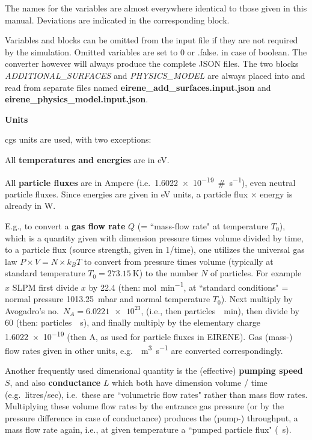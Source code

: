 The names for the variables are almost everywhere identical to those given in this manual. 
Deviations are indicated in the corresponding block.

Variables and blocks can be omitted from the input file if they are not required by the 
simulation. Omitted variables are set to 0 or .false. in case of boolean. The converter however
will always produce the complete JSON files. The two blocks \textsl{ADDITIONAL\_SURFACES} 
and \textsl{PHYSICS\_MODEL} are always placed into and read from separate files named 
\textbf{eirene\_add\_surfaces.input.json} and \textbf{eirene\_physics\_model.input.json}.


\medskip

\medskip

\textbf{Units} 

cgs units are used, with two exceptions:

\medskip

All \textbf{temperatures and energies} are in \si{\electronvolt}.

All \textbf{particle fluxes} are in Ampere (i.e.\
\SI{1.6022e-19}{\#\per\second}), even neutral particle fluxes.
Since energies are given in \si{\electronvolt} units, a particle flux $\times$
energy is already in \si{\watt}.

E.g., to convert a \textbf{gas flow rate} $Q$ (= ``mass-flow rate" at
temperature $T_0$), which is a quantity given with dimension pressure times
volume divided by time, to a particle flux (source strength, given in
1/\;time), one utilizes the universal gas law $P \times V = N \times k_B T$ to
convert from pressure times volume (typically at standard temperature $T_0=
  \SI{273.15}{\kelvin}$) to the number $N$ of particles.
For example  $x$ \ac{SLPM} first divide $x$ by \num{22.4} (then:
\si{\mole\per\minute}, at ``standard conditions" = normal pressure
\SI{1013.25}{\milli\bar} and normal temperature $T_0$).
Next multiply by Avogadro's no.\ $N_A = \num{6.0221e23}$, (i.e., then
particles~\si{\per\minute}), then divide by \num{60} (then:
particles~\si{\per\second}), and finally multiply by the elementary charge
\num{1.6022e-19}
(then \si{\ampere}, as used for particle fluxes in EIRENE).
Gas (mass-) flow rates given in other units, e.g.\
\si{\torr\cubic\metre\per\second} are converted correspondingly.

Another frequently used dimensional quantity is the (effective) 
\textbf{pumping speed} $S$, and also \textbf{conductance} $L$ which both have 
dimension volume / time (e.g.\ litres/sec), i.e.\ these are 
``volumetric flow rates" rather than mass flow rates.
Multiplying these volume flow rates by the entrance gas pressure (or by the
pressure difference in case of conductance) produces the (pump-) throughput, a
mass flow rate again, i.e., at given temperature a ``pumped particle flux"
(\si{\per\second}).

